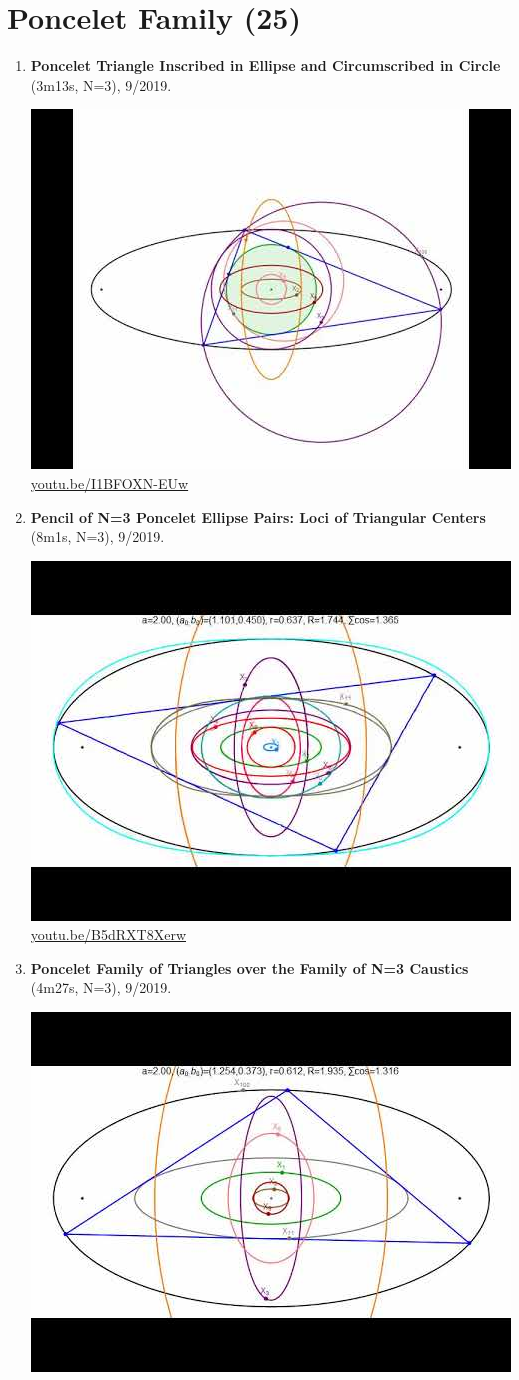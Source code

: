 \documentclass[12pt]{amsart}
\begin{document}
\section{Poncelet Family (25)}

\begin{enumerate}[resume]
\item \textbf{Poncelet Triangle Inscribed in Ellipse and Circumscribed in Circle} (3m13s, N=3), 9/2019. 
\begin{center}\includegraphics[width=.5\textwidth]{pics/I1BFOXN-EUw.jpg} \\ 
\href{https://youtu.be/I1BFOXN-EUw}{\url{youtu.be/I1BFOXN-EUw}}\end{center}
% 
\item \textbf{Pencil of N=3 Poncelet Ellipse Pairs: Loci of Triangular Centers} (8m1s, N=3), 9/2019. 
\begin{center}\includegraphics[width=.5\textwidth]{pics/B5dRXT8Xerw.jpg} \\ 
\href{https://youtu.be/B5dRXT8Xerw}{\url{youtu.be/B5dRXT8Xerw}}\end{center}
% 
\item \textbf{Poncelet Family of Triangles over the Family of N=3 Caustics} (4m27s, N=3), 9/2019. 
\begin{center}\includegraphics[width=.5\textwidth]{pics/53pCKKd_5qI.jpg} \\ 

\end{center}
\end{enumerate}
\end{document}
